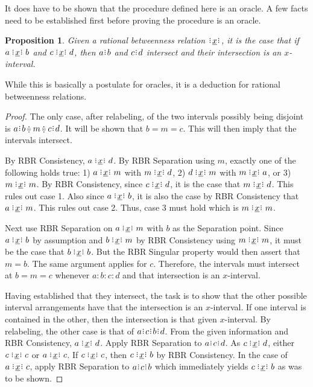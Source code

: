 \documentclass[12pt]{article}
\newtheorem{proposition}{Proposition}[section]
\begin{document}
It does have to be shown that the procedure defined here is an oracle. A few facts need to be established first before proving the procedure is an oracle. 

\begin{proposition}
    Given a rational betweenness relation $\xrel$, it is the case that if $a \xrel b$ and $c \xrel d$, then $a\rint b$ and $c\rint d$ intersect and their intersection is an $x$-interval.
\end{proposition}

While this is basically a postulate for oracles, it is a deduction for rational betweenness relations. 

\begin{proof}
    The only case, after relabeling, of the two intervals possibly being disjoint is $a\rint b \betneq m \betneq c\rint d$. It will be shown that $b = m = c$. This will then imply that the intervals intersect. 
    
    By RBR Consistency, $a \xrel d$. By RBR Separation using $m$, exactly one of the following holds true:  1) $a \xrel m$ with \sout{$m \xrel d$}, 2) $d \xrel m$ with \sout{$m \xrel a$}, or 3) $m \xrel m$. By RBR Consistency, since $c \xrel d$, it is the case that $m \xrel d$. This rules out case 1. Also since $a \xrel b$, it is also the case by RBR Consistency that $a \xrel m$. This rules out case 2. Thus, case 3 must hold which is $m \xrel m$. 
    
    Next use RBR Separation on $a \xrel m$ with $b$ as the Separation point. Since $a \xrel b$ by assumption and $b \xrel m$ by RBR Consistency using $m \xrel m$, it must be the case that $b \xrel b$. But the RBR Singular property would then assert that $m = b$. The same argument applies for $c$. Therefore, the intervals must intersect at $b = m = c$ whenever $a:b:c:d$ and that intersection is an $x$-interval. 

    Having established that they intersect, the task is to show that the other possible interval arrangements have that the intersection is an $x$-interval. If one interval is contained in the other, then the intersection is that given $x$-interval. By relabeling, the other case is that of $a\rint c\rint b\rint d$. From the given information and RBR Consistency, $a \xrel d$. Apply RBR Separation to $a\rint c\rint d$. As $c \xrel d$, either $c \xrel c$ or \sout{$a \xrel c$}. If $c \xrel c$, then $c \xrel b$ by RBR Consistency. In the case of \sout{$a \xrel c$}, apply RBR Separation to $a\rint c\rint b$ which immediately yields $c \xrel b$ as was to be shown. 
    
\end{proof}
\end{document}
